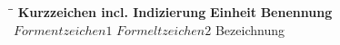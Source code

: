 
\begin{tabbing}
\hspace{7cm} \= \hspace{3cm}\= \kill
\textbf{Kurzzeichen incl. Indizierung} \> \textbf{Einheit} \> \textbf{Benennung} \\
$Formentzeichen1$ \> $Formeltzeichen2$ \> Bezeichnung \\
\end{tabbing}

\clearpage
